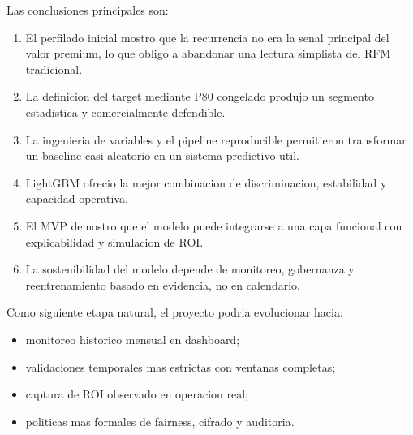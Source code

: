 \documentclass[12pt,letterpaper]{article}
\begin{document}
Las conclusiones principales son:
\begin{enumerate}[label=\arabic*.]
    \item El perfilado inicial mostro que la recurrencia no era la senal principal del valor premium, lo que obligo a abandonar una lectura simplista del RFM tradicional.
    \item La definicion del target mediante P80 congelado produjo un segmento estadistica y comercialmente defendible.
    \item La ingenieria de variables y el pipeline reproducible permitieron transformar un baseline casi aleatorio en un sistema predictivo util.
    \item LightGBM ofrecio la mejor combinacion de discriminacion, estabilidad y capacidad operativa.
    \item El MVP demostro que el modelo puede integrarse a una capa funcional con explicabilidad y simulacion de ROI.
    \item La sostenibilidad del modelo depende de monitoreo, gobernanza y reentrenamiento basado en evidencia, no en calendario.
\end{enumerate}

Como siguiente etapa natural, el proyecto podria evolucionar hacia:
\begin{itemize}
    \item monitoreo historico mensual en dashboard;
    \item validaciones temporales mas estrictas con ventanas completas;
    \item captura de ROI observado en operacion real;
    \item politicas mas formales de fairness, cifrado y auditoria.
\end{itemize}
\end{document}
